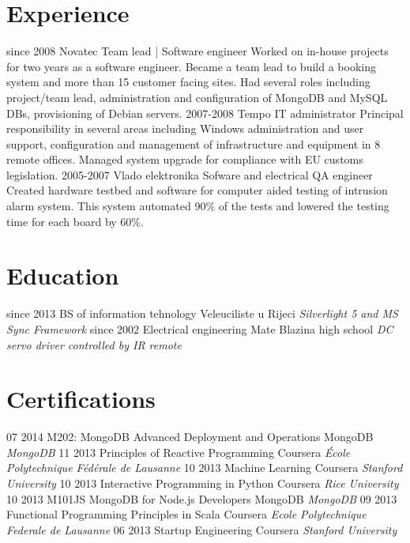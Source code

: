 \documentclass[]{cv}
\begin{document}
\section{Experience}

\begin{entrylist}
  \entry
    {since 2008}
    {Novatec}
    {Team lead | Software engineer}
    {Worked on in-house projects for two years as a software engineer. Became a team lead to build a booking system and more than 15 customer facing sites. Had several roles including project/team lead, administration and configuration of MongoDB and MySQL DBs, provisioning of Debian servers.}
  \entry
    {2007-2008}
    {Tempo}
    {IT administrator}
    {Principal responsibility in several areas including Windows administration and user support, configuration and management of infrastructure and equipment in 8 remote offices. Managed system upgrade for compliance with EU customs legislation.}
  \entry
    {2005-2007}
    {Vlado elektronika}
    {Sofware and electrical QA engineer}
    {Created hardware testbed and software for computer aided testing of intrusion alarm system. This system automated 90\% of the tests and lowered the testing time for each board by 60\%.}
\end{entrylist}

\section{Education}

\begin{entrylist}
  \entry
    {since 2013}
    {BS of information tehnology}
    {Veleuciliste u Rijeci}
    {\emph{Silverlight 5 and MS Sync Framework}}
  \entry
    {since 2002}
    {Electrical engineering}
    {Mate Blazina high school}
    {\emph{DC servo driver controlled by IR remote}}
\end{entrylist}
\section{Certifications}
\begin{entrylist}
  \entry
    {07 2014} 
    {M202: MongoDB Advanced Deployment and Operations}
    {MongoDB}
    {\emph{MongoDB}}
  \entry
    {11 2013}
    {Principles of Reactive Programming}
    {Coursera}
    {\emph{École Polytechnique Fédérale de Lausanne}}
  \entry
    {10 2013}
    {Machine Learning} 
    {Coursera}
    {\emph{Stanford University}}
  \entry
    {10 2013}
    {Interactive Programming in Python}
    {Coursera}
    {\emph{Rice University}}
  \entry
    {10 2013}
    {M101JS MongoDB for Node.js Developers}
    {MongoDB}
    {\emph{MongoDB}}
  \entry
    {09 2013}
    {Functional Programming Principles in Scala}
    {Coursera}
    {\emph{Ecole Polytechnique Federale de Lausanne}}
  \entry
    {06 2013}
    {Startup Engineering}
    {Coursera}
    {\emph{Stanford University}}
\end{entrylist}
\end{document}
